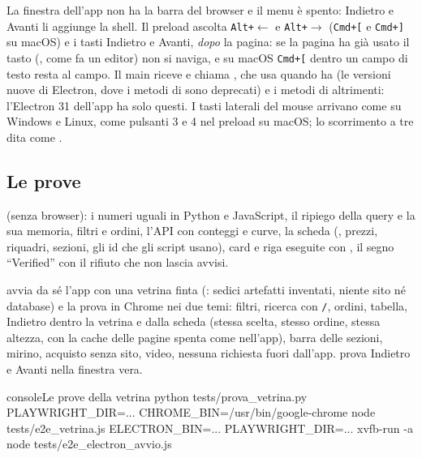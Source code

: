 La finestra dell'app non ha la barra del browser e il menu è spento: Indietro
e Avanti li aggiunge la shell. Il preload ascolta \texttt{Alt+}$\leftarrow$ e
\texttt{Alt+}$\rightarrow$ (\texttt{Cmd+[} e \texttt{Cmd+]} su macOS) e i
tasti Indietro e Avanti, \emph{dopo} la pagina: se la pagina ha già usato il
tasto (, come fa un editor) non si naviga, e su macOS
\texttt{Cmd+[} dentro un campo di testo resta al campo. Il main riceve
 e chiama , che usa
 quando ha  (le versioni
nuove di Electron, dove i metodi di  sono deprecati) e i
metodi di  altrimenti: l'Electron 31 dell'app ha solo
questi. I tasti laterali del
mouse arrivano come  su Windows e Linux, come pulsanti 3 e 4
nel preload su macOS; lo scorrimento a tre dita come .

\subsection{Le prove}

 (senza browser): i numeri uguali in Python e
JavaScript, il ripiego della query e la sua memoria, filtri e ordini,
l'API con conteggi e curve, la scheda (, prezzi, riquadri,
sezioni, gli id che gli script usano), card e riga eseguite con ,
il segno \enquote{Verified} con il rifiuto che non lascia avvisi.

 avvia da sé l'app con una vetrina finta
(: sedici artefatti inventati, niente sito né
database) e la prova in Chrome nei due temi: filtri, ricerca con
\texttt{/}, ordini, tabella, Indietro dentro la vetrina e dalla scheda
(stessa scelta, stesso ordine, stessa altezza, con la cache delle pagine
spenta come nell'app), barra delle sezioni, mirino, acquisto senza sito,
video, nessuna richiesta fuori dall'app. 
prova Indietro e Avanti nella finestra vera.

\begin{codiceInterno}{console}{Le prove della vetrina}{}
python tests/prova_vetrina.py
PLAYWRIGHT_DIR=... CHROME_BIN=/usr/bin/google-chrome node tests/e2e_vetrina.js
ELECTRON_BIN=... PLAYWRIGHT_DIR=... xvfb-run -a node tests/e2e_electron_avvio.js
\end{codiceInterno}
